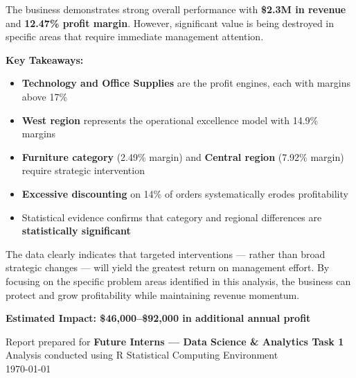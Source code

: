 \documentclass[11pt,a4paper]{article}
\begin{document}
\begin{tcolorbox}[
    colback=primary!5,
    colframe=primary!50,
    arc=8pt,
    left=15pt,
    right=15pt,
    top=15pt,
    bottom=15pt
]
The business demonstrates strong overall performance with \textbf{\$2.3M in revenue} and \textbf{12.47\% profit margin}. However, significant value is being destroyed in specific areas that require immediate management attention.

\vspace{8pt}

\textbf{Key Takeaways:}
\begin{itemize}[leftmargin=*]
    \item \textbf{Technology and Office Supplies} are the profit engines, each with margins above 17\%
    \item \textbf{West region} represents the operational excellence model with 14.9\% margins
    \item \textbf{Furniture category} (2.49\% margin) and \textbf{Central region} (7.92\% margin) require strategic intervention
    \item \textbf{Excessive discounting} on 14\% of orders systematically erodes profitability
    \item Statistical evidence confirms that category and regional differences are \textbf{statistically significant}
\end{itemize}

\vspace{8pt}

The data clearly indicates that targeted interventions — rather than broad strategic changes — will yield the greatest return on management effort. By focusing on the specific problem areas identified in this analysis, the business can protect and grow profitability while maintaining revenue momentum.

\vspace{8pt}

\begin{center}
\textbf{Estimated Impact: \$46,000--\$92,000 in additional annual profit}
\end{center}
\end{tcolorbox}

\vspace{1cm}

\begin{center}

\vspace{6pt}

{\color{darktext}\small Report prepared for \textbf{Future Interns — Data Science \& Analytics Task 1}}\\[4pt]
{\color{darktext}\small Analysis conducted using R Statistical Computing Environment}\\[4pt]
{\color{darktext}\small \today}
\end{center}
\end{document}
